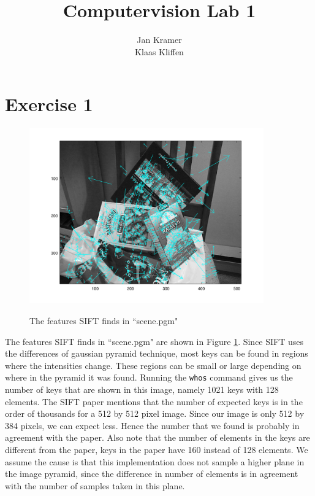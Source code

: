 \documentclass[11pt,a4paper]{article}
\author{Jan Kramer\\Klaas Kliffen}
\title{Computervision Lab 1}
\begin{document}
\maketitle

\section*{Exercise 1}

\begin{figure}[h]
\centering
    \includegraphics[width=0.9\textwidth]{./img/scene-keys.png} \\
\caption{The features SIFT finds in ``scene.pgm"}
\label{fig:scenekeys}
\end{figure}

The features SIFT finds in ``scene.pgm" are shown in Figure \ref{fig:scenekeys}.
Since SIFT uses the differences of gaussian pyramid technique, most keys can be found in regions where the intensities change.
These regions can be small or large depending on where in the pyramid it was found.
Running the \verb+whos+ command gives us the number of keys that are shown in this image, namely 1021 keys with 128 elements.
The SIFT paper mentions that the number of expected keys is in the order of thousands for a 512 by 512 pixel image.
Since our image is only 512 by 384 pixels, we can expect less.
Hence the number that we found is probably in agreement with the paper.
Also note that the number of elements in the keys are different from the paper, keys in the paper have 160 instead of 128 elements.
We assume the cause is that this implementation does not sample a higher plane in the image pyramid, since the difference in number of elements is in agreement with the number of samples taken in this plane.
\end{document}
